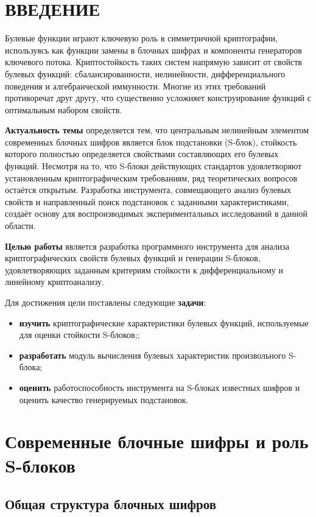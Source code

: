 \section*{ВВЕДЕНИЕ}

Булевые функции играют ключевую роль в симметричной криптографии,
используясь как функции замены в блочных шифрах и компоненты генераторов
ключевого потока. Криптостойкость таких систем напрямую зависит от свойств
булевых функций: сбалансированности, нелинейности, дифференциального
поведения и алгебраической иммунности. Многие из этих требований
противоречат друг другу, что существенно усложняет конструирование функций
с оптимальным набором свойств.

\textbf{Актуальность темы} определяется тем, что центральным нелинейным
элементом современных блочных шифров является блок подстановки (S-блок),
стойкость которого полностью определяется свойствами составляющих его
булевых функций. Несмотря на то, что S-блоки действующих стандартов
удовлетворяют установленным криптографическим требованиям, ряд
теоретических вопросов остаётся открытым. Разработка инструмента, совмещающего анализ булевых свойств и направленный поиск подстановок с заданными характеристиками, создаёт
основу для воспроизводимых экспериментальных исследований в данной области.

\textbf{Целью работы} является разработка программного инструмента для
анализа криптографических свойств булевых функций и генерации S-блоков, удовлетворяющих заданным критериям стойкости
к дифференциальному и линейному криптоанализу.

Для достижения цели поставлены следующие \textbf{задачи}:
\begin{itemize}
    \item \textbf{изучить} криптографические характеристики булевых функций,
        используемые для оценки стойкости S-блоков;;
    \item \textbf{разработать} модуль вычисления булевых характеристик
        произвольного S-блока;
    \item \textbf{оценить} работоспособность инструмента на S-блоках
        известных шифров и оценить качество генерируемых подстановок.
\end{itemize}

\section{Современные блочные шифры и роль S-блоков}
\subsection{Общая структура блочных шифров}

